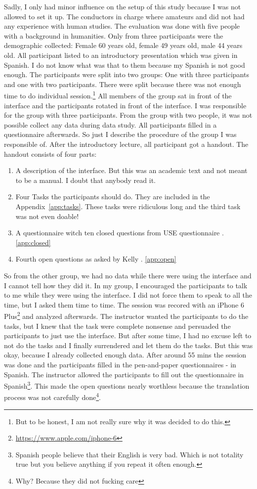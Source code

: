 \documentclass[11pt]{report}
\begin{document}
Sadly, I only had minor influence on the setup of this study because I was not allowed to set it up. The conductors in charge where amateurs and did not had any experience with human studies. The evaluation was done with five people with a background in humanities. Only from three participants were the demographic collected: Female 60 years old, female 49 years old, male 44 years old. All participant listed to an introductory presentation which was given in Spanish. I do not know what was that to them because my Spanish is not good enough. The participants were split into two groups: One with three participants and one with two participants. There were split because there was not enough time to do individual session.\footnote{But to be honest, I am not really sure why it was decided to do this.} All members of the group sat in front of the interface and the participants rotated in front of the interface. I was responsible for the group with three participants. From the group with two people, it was not possible collect any data during data study. All participants filled in a questionnaire afterwards. So just I describe the procedure of the group I was responsible of. After the introductory lecture, all participant got a handout. The handout consists of four parts:
\begin{enumerate}
	\item A description of the interface. But this was an academic text and not meant to be a manual. I doubt that anybody read it.
	\item Four Tasks the participants should do. They are included in the Appendix~\ref{app:tasks}. These tasks were ridiculous long and the third task was not even doable!
	\item A questionnaire witch ten closed questions from USE questionnaire \cite{lund2001measuring}. \ref{app:closed}
	\item Fourth open questions as asked by Kelly  \cite{Kelly2008}. \ref{app:open}
\end{enumerate}

So from the other group, we had no data while there were using the interface and I cannot tell how they did it. In my group, I encouraged the participants to talk to me while they were using the interface. I did not force them to speak to all the time, but I asked them time to time. The session was recored with an iPhone 6 Plus\footnote{\url{https://www.apple.com/iphone-6}} and analyzed afterwards. The instructor wanted the participants to do the tasks, but I knew that the task were complete nonsense and persuaded the participants to just use the interface. But after some time, I had no excuse left to not do the tasks and I finally surrendered and let them do the tasks. But this was okay, because I already collected enough data. After around 55 mins the session was done and the participants filled in the pen-and-paper questionnaires - in Spanish. The instructor allowed the participants to fill out the questionnaire in Spanish\footnote{Spanish people believe that their English is very bad. Which is not totality true but you believe anything if you repeat it often enough.}. This made the open questions nearly worthless because the translation process was not carefully done\footnote{Why? Because they did not fucking care}.
\end{document}
